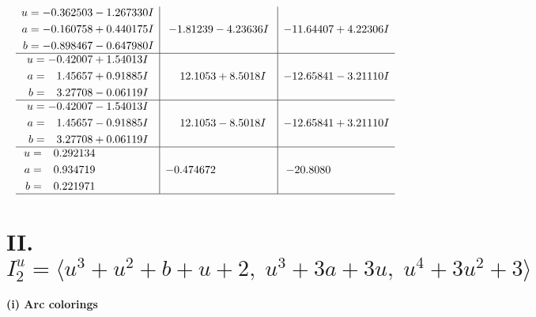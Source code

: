 \documentclass[1p]{elsarticle_modified}
\theoremstyle{definition}
\begin{document}
$$\begin{array}{c|c|c}
\begin{aligned}
u &= -0.362503 - 1.267330 I \\
a &= -0.160758 + 0.440175 I \\
b &= -0.898467 - 0.647980 I\end{aligned}
 & -1.81239 - 4.23636 I & -11.64407 + 4.22306 I \\ \hline\begin{aligned}
u &= -0.42007 + 1.54013 I \\
a &= \phantom{-}1.45657 + 0.91885 I \\
b &= \phantom{-}3.27708 - 0.06119 I\end{aligned}
 & \phantom{-}12.1053 + 8.5018 I & -12.65841 - 3.21110 I \\ \hline\begin{aligned}
u &= -0.42007 - 1.54013 I \\
a &= \phantom{-}1.45657 - 0.91885 I \\
b &= \phantom{-}3.27708 + 0.06119 I\end{aligned}
 & \phantom{-}12.1053 - 8.5018 I & -12.65841 + 3.21110 I \\ \hline\begin{aligned}
u &= \phantom{-}0.292134\phantom{ +0.000000I} \\
a &= \phantom{-}0.934719\phantom{ +0.000000I} \\
b &= \phantom{-}0.221971\phantom{ +0.000000I}\end{aligned}
 & -0.474672\phantom{ +0.000000I} & -20.8080\phantom{ +0.000000I}\\
 \hline 
 \end{array}$$\newpage\newpage\renewcommand{\arraystretch}{1}
\centering \section*{II. $I^u_{2}= \langle u^3+u^2+b+u+2,\;u^3+3 a+3 u,\;u^4+3 u^2+3 \rangle$}
\flushleft \textbf{(i) Arc colorings}\\
\end{document}
